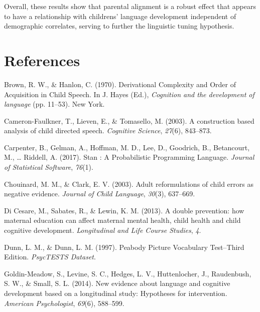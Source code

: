 \documentclass[10pt, letterpaper]{article}
\begin{document}
Overall, these results show that parental alignment is a robust effect
that appears to have a relationship with childrens' language development
independent of demographic correlates, serving to further the linguistic
tuning hypothesis.

\hypertarget{references}{%
\section{References}\label{references}}

\setlength{\parindent}{-0.1in} 
\setlength{\leftskip}{0.125in}

\noindent

\hypertarget{refs}{}
\leavevmode\hypertarget{ref-Brown:1970wd}{}%
Brown, R. W., \& Hanlon, C. (1970). Derivational Complexity and Order of
Acquisition in Child Speech. In J. Hayes (Ed.), \emph{Cognition and the
development of language} (pp. 11--53). New York.

\leavevmode\hypertarget{ref-CameronFaulkner:2003ge}{}%
Cameron-Faulkner, T., Lieven, E., \& Tomasello, M. (2003). A
construction based analysis of child directed speech. \emph{Cognitive
Science}, \emph{27}(6), 843--873.

\leavevmode\hypertarget{ref-Carpenter:2017ke}{}%
Carpenter, B., Gelman, A., Hoffman, M. D., Lee, D., Goodrich, B.,
Betancourt, M., \ldots{} Riddell, A. (2017). Stan : A Probabilistic
Programming Language. \emph{Journal of Statistical Software},
\emph{76}(1).

\leavevmode\hypertarget{ref-Chouinard:2003kq}{}%
Chouinard, M. M., \& Clark, E. V. (2003). Adult reformulations of child
errors as negative evidence. \emph{Journal of Child Language},
\emph{30}(3), 637--669.

\leavevmode\hypertarget{ref-DiCesare:2013ip}{}%
Di Cesare, M., Sabates, R., \& Lewin, K. M. (2013). A double prevention:
how maternal education can affect maternal mental health, child health
and child cognitive development. \emph{Longitudinal and Life Course
Studies}, \emph{4}.

\leavevmode\hypertarget{ref-PeabodyPictureVoca:im}{}%
Dunn, L. M., \& Dunn, L. M. (1997). Peabody Picture Vocabulary
Test--Third Edition. \emph{PsycTESTS Dataset}.

\leavevmode\hypertarget{ref-GoldinMeadow:2014hr}{}%
Goldin-Meadow, S., Levine, S. C., Hedges, L. V., Huttenlocher, J.,
Raudenbush, S. W., \& Small, S. L. (2014). New evidence about language
and cognitive development based on a longitudinal study: Hypotheses for
intervention. \emph{American Psychologist}, \emph{69}(6), 588--599.
\end{document}
